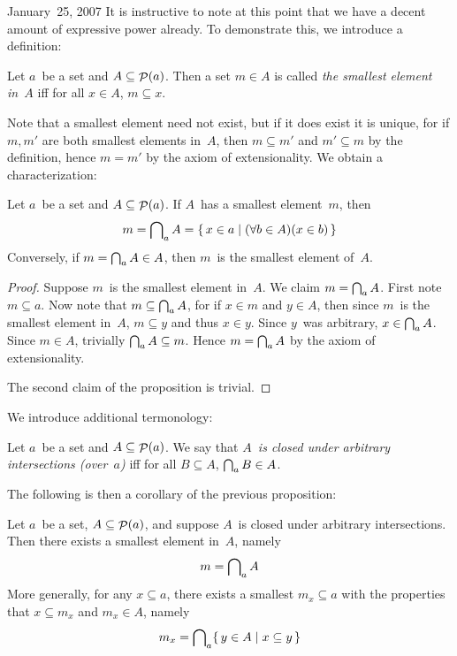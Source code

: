 \begin{lecture}{January~25, 2007}
It is instructive to note at this point that we have a decent amount of expressive power already. To demonstrate this, we introduce a definition:
\begin{defn}
Let \(a\)~be a set and \(A\subseteq\mathop{\mathcal{P}}(a)\). Then a set \(m\in A\) is called \emph{the smallest element in~\(A\)} iff for all \(x\in A\), \(m\subseteq x\).
\end{defn}
\noindent Note that a smallest element need not exist, but if it does exist it is unique, for if \(m,m'\) are both smallest elements in~\(A\), then \(m\subseteq m'\) and \(m'\subseteq m\) by the definition, hence \(m=m'\) by the axiom of extensionality. We obtain a characterization:
\begin{prop}
Let \(a\)~be a set and \(A\subseteq\mathop{\mathcal{P}}(a)\). If \(A\)~has a smallest element~\(m\), then
\[m=\bigcap\nolimits_a A=\{\,x\in a\mid (\forall b\in A)(x\in b)\,\}\]
Conversely, if \(m=\bigcap_a A\in A\), then \(m\)~is the smallest element of~\(A\).
\end{prop}
\begin{proof}
Suppose \(m\)~is the smallest element in~\(A\). We claim \(m=\bigcap_a A\). First note \(m\subseteq a\). Now note that \(m\subseteq\bigcap_a A\), for if \(x\in m\) and \(y\in A\), then since \(m\)~is the smallest element in~\(A\), \(m\subseteq y\) and thus \(x\in y\). Since \(y\)~was arbitrary, \(x\in\bigcap_a A\). Since \(m\in A\), trivially \(\bigcap_a A\subseteq m\). Hence \(m=\bigcap_a A\) by the axiom of extensionality.

The second claim of the proposition is trivial.
\end{proof}

We introduce additional termonology:
\begin{defn}
Let \(a\)~be a set and \(A\subseteq\mathop{\mathcal{P}}(a)\). We say that \emph{\(A\)~is closed under arbitrary intersections (over~\(a\))} iff for all \(B\subseteq A\), \(\bigcap_a B\in A\).
\end{defn}
\noindent The following is then a corollary of the previous proposition:
\begin{cor}
Let \(a\)~be a set, \(A\subseteq\mathop{\mathcal{P}}(a)\), and suppose \(A\)~is closed under arbitrary intersections. Then there exists a smallest element in~\(A\), namely
\[m=\bigcap\nolimits_a A\]
More generally, for any \(x\subseteq a\), there exists a smallest \(m_x\subseteq a\) with the properties that \(x\subseteq m_x\) and \(m_x\in A\), namely
\[m_x=\bigcap\nolimits_a\{\,y\in A\mid x\subseteq y\,\}\]
\end{cor}


\end{lecture}
